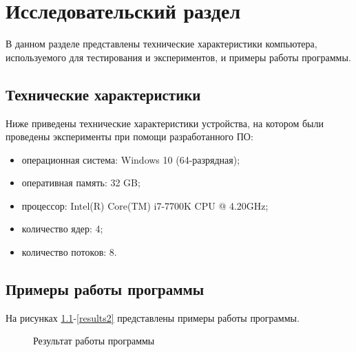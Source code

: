 \chapter{Исследовательский раздел}
В данном разделе представлены технические характеристики компьютера, используемого для тестирования и экспериментов, и примеры работы программы.
 \section{Технические характеристики}

Ниже приведены технические характеристики устройства, на котором были проведены эксперименты при помощи разработанного ПО:

\begin{itemize}
	\item операционная система: Windows 10 (64-разрядная);
	\item оперативная память: 32 GB;
	\item процессор: Intel(R) Core(TM) i7-7700K CPU @ 4.20GHz;
	\item количество ядер: 4;
	\item количество потоков: 8.
\end{itemize}

\section{Примеры работы программы}
На рисунках \ref{results1}-\ref{results2} представлены примеры работы программы.

\begin{figure}[h]
	\caption{Результат работы программы}
	\label{results1}
\end{figure}

